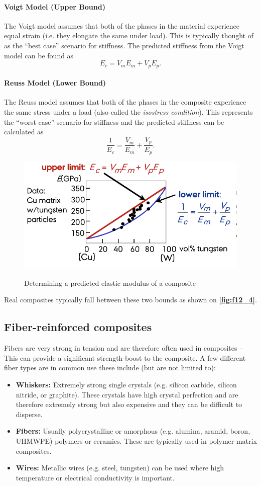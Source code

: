 \paragraph{Voigt Model (Upper Bound)} The Voigt model assumes that both of the phases in the material experience equal strain (i.e. they elongate the same under load). This is typically thought of as the ``best case'' scenario for stiffness. The predicted stiffness from the Voigt model can be found as
\[ 
E_c = V_m E_m + V_p E_p
.\]

\paragraph{Reuss Model (Lower Bound)} The Reuss model assumes that both of the phases in the composite experience the same stress under a load (also called the \textit{isostress condition}). This represents the ``worst-case'' scenario for stiffness and the predicted stiffness can be calculated as
\[ 
\frac{1}{E_c} = \frac{V_m}{E_m} + \frac{V_p}{E_p}
.\]
\begin{figure} [ht]
  \centering
  \caption{Determining a predicted elastic modulus of a composite}
  \includegraphics[width=0.5\linewidth]{./figures/f12_4.png}
  \label{fig:f12_4}
\end{figure}
Real composites typically fall between these two bounds as shown on \textbf{\autoref{fig:f12_4}}.


\subsection{Fiber-reinforced composites}
Fibers are very strong in tension and are therefore often used in composites -- This can provide a significant strength-boost to the composite. A few different fiber types are in common use these include (but are not limited to):
\begin{itemize}
  \item \textbf{Whiskers:} Extremely strong single crystals (e.g. silicon carbide, silicon nitride, or graphite). These crystals have high crystal perfection and are therefore extremely strong but also expensive and they can be difficult to disperse.
  \item \textbf{Fibers:} Usually polycrystalline or amorphous (e.g. alumina, aramid, boron, UHMWPE) polymers or ceramics. These are typically used in polymer-matrix composites.
  \item \textbf{Wires:} Metallic wires (e.g. steel, tungsten) can be used where high temperature or electrical conductivity is important.
\end{itemize}

